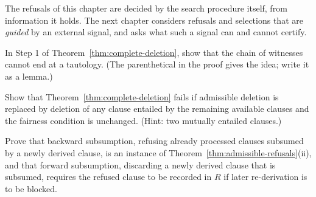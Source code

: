 The refusals of this chapter are decided by the search procedure itself, from information it holds. The next chapter considers refusals and selections that are \emph{guided} by an external signal, and asks what such a signal can and cannot certify.

\begin{exercise}
In Step 1 of Theorem~\ref{thm:complete-deletion}, show that the chain of witnesses cannot end at a tautology. (The parenthetical in the proof gives the idea; write it as a lemma.)
\end{exercise}

\begin{exercise}
Show that Theorem~\ref{thm:complete-deletion} fails if admissible deletion is replaced by deletion of any clause entailed by the remaining available clauses and the fairness condition is unchanged. (Hint: two mutually entailed clauses.)
\end{exercise}

\begin{exercise}
Prove that backward subsumption, refusing already processed clauses subsumed by a newly derived clause, is an instance of Theorem~\ref{thm:admissible-refusals}(ii), and that forward subsumption, discarding a newly derived clause that is subsumed, requires the refused clause to be recorded in $R$ if later re-derivation is to be blocked.
\end{exercise}
